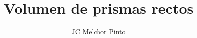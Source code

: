 \documentclass[12pt,addpoints,answers]{guia}
\title{Volumen de prismas rectos}
\author{JC Melchor Pinto}
\begin{document}
\pagestyle{headandfoot}

\INFO
\begin{multicols}{2}
    
    
    
\end{multicols}
\begin{questions}
    \questionboxed[10]{}
    \questionboxed[10]{}
    \questionboxed[10]{}
    \questionboxed[10]{}
    \questionboxed[10]{}
    \questionboxed[10]{}
    \questionboxed[10]{}
    \questionboxed[10]{}
    \questionboxed[10]{}
    \questionboxed[10]{}
    \questionboxed[10]{}
    \questionboxed[10]{}
\end{questions}
\end{document}
